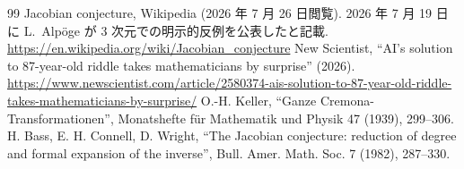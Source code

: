 \documentclass[paper=a4,fontsize=10.5pt,jafontsize=10.5pt]{jlreq}
\theoremstyle{plain}
\theoremstyle{definition}
\begin{document}
\begin{thebibliography}{99}
 Jacobian conjecture, Wikipedia (2026 年 7 月 26 日閲覧). 2026 年 7 月 19 日に L.~Alp\"oge が 3 次元での明示的反例を公表したと記載. \url{https://en.wikipedia.org/wiki/Jacobian_conjecture}
 New Scientist, ``AI's solution to 87-year-old riddle takes mathematicians by surprise'' (2026). \url{https://www.newscientist.com/article/2580374-ais-solution-to-87-year-old-riddle-takes-mathematicians-by-surprise/}
 O.-H. Keller, ``Ganze Cremona-Transformationen'', Monatshefte f\"ur Mathematik und Physik 47 (1939), 299--306.
 H. Bass, E. H. Connell, D. Wright, ``The Jacobian conjecture: reduction of degree and formal expansion of the inverse'', Bull. Amer. Math. Soc. 7 (1982), 287--330.
\end{thebibliography}
\end{document}
